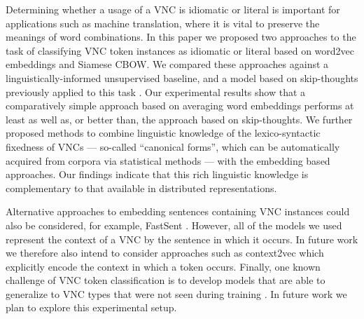 \documentclass[11pt,a4paper]{article}
\begin{document}
Determining whether a usage of a VNC is idiomatic or literal is
important for applications such as machine translation, where it is
vital to preserve the meanings of word combinations. 
In this paper we proposed two approaches to the task of classifying
VNC token instances as idiomatic or literal based on word2vec
embeddings and Siamese CBOW. We compared these approaches against a
linguistically-informed unsupervised baseline, and a model based on
skip-thoughts previously applied to this task
\citep{salton-ross-kelleher}. Our experimental results show that a
comparatively simple approach based on averaging word embeddings
performs at least as well as, or better than, the approach based on
skip-thoughts. We further proposed methods to combine linguistic
knowledge of the lexico-syntactic fixedness of VNCs --- so-called
``canonical forms'', which can be automatically acquired from corpora
via statistical methods --- with the embedding based approaches. Our
findings indicate that this rich linguistic knowledge is complementary
to that available in distributed representations.


Alternative approaches to embedding sentences containing VNC
instances could also be considered, for example, FastSent
\citep{Hill+:2016}. However, all of the models we used represent the
context of a VNC by the sentence in which it occurs. In future work we
therefore also intend to consider approaches such as context2vec
\citep{melamud2016context2vec} which explicitly encode the context in
which a token occurs. Finally, one known challenge of VNC token
classification is to develop models that are able to generalize to VNC
types that were not seen during training \citep{gharbieh+:2016}. In
future work we plan to explore this experimental setup.


\end{document}
